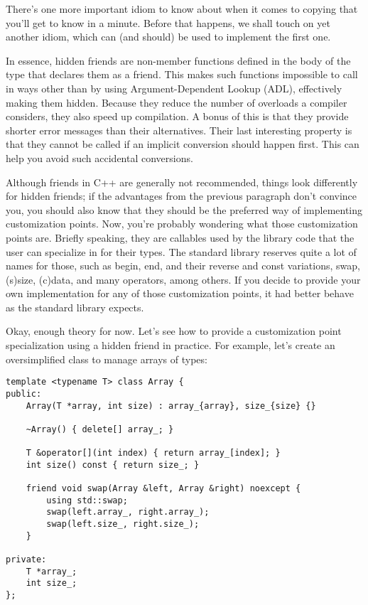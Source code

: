 There's one more important idiom to know about when it comes to copying that you'll get to know in a minute. Before that happens, we shall touch on yet another idiom, which can (and should) be used to implement the first one.


In essence, hidden friends are non-member functions defined in the body of the type that declares them as a friend. This makes such functions impossible to call in ways other than by using Argument-Dependent Lookup (ADL), effectively making them hidden. Because they reduce the number of overloads a compiler considers, they also speed up compilation. A bonus of this is that they provide shorter error messages than their alternatives. Their last interesting property is that they cannot be called if an implicit conversion should happen first. This can help you avoid such accidental conversions.

Although friends in C++ are generally not recommended, things look differently for hidden friends; if the advantages from the previous paragraph don't convince you, you should also know that they should be the preferred way of implementing customization points. Now, you're probably wondering what those customization points are. Briefly speaking, they are callables used by the library code that the user can specialize in for their types. The standard library reserves quite a lot of names for those, such as begin, end, and their reverse and const variations, swap, (s)size, (c)data, and many operators, among others. If you decide to provide your own implementation for any of those customization points, it had better behave as the standard library expects.

Okay, enough theory for now. Let's see how to provide a customization point specialization using a hidden friend in practice. For example, let's create an oversimplified class to manage arrays of types:

\begin{lstlisting}[style=styleCXX]
template <typename T> class Array {
public:
	Array(T *array, int size) : array_{array}, size_{size} {}
	
	~Array() { delete[] array_; }
	
	T &operator[](int index) { return array_[index]; }
	int size() const { return size_; }
	
	friend void swap(Array &left, Array &right) noexcept {
		using std::swap;
		swap(left.array_, right.array_);
		swap(left.size_, right.size_);
	}

private:
	T *array_;
	int size_;
};
\end{lstlisting}

